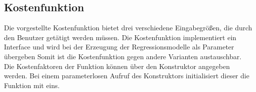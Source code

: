 \subsection{Kostenfunktion}

Die vorgestellte Kostenfunktion bietet drei verschiedene Eingabegrößen, die durch den Benutzer getätigt werden müssen.
Die Kostenfunktion implementiert ein Interface und wird bei der Erzeugung der Regressionsmodelle als Parameter übergeben
Somit ist die Kostenfunktion gegen andere Varianten austauschbar.
Die Kostenfaktoren der Funktion können über den Konstruktor angegeben werden.
Bei einem parameterlosen Aufruf des Konstruktors initialisiert dieser die Funktion mit eins.




